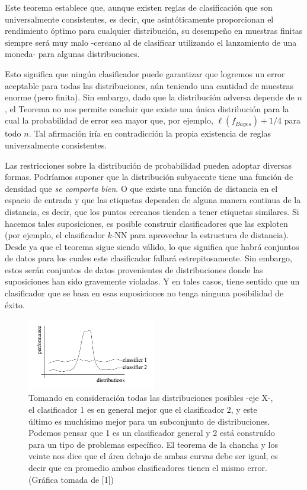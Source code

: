 \documentclass{report}
\begin{document}
Este teorema establece que, aunque existen reglas de clasificación que son universalmente 
consistentes, es decir, que asintóticamente proporcionan el rendimiento óptimo para cualquier 
distribución, su desempeño en muestras finitas siempre será muy malo -cercano al de clasificar utilizando el lanzamiento de una moneda- para algunas 
distribuciones. \newline

Esto significa que ningún clasificador puede garantizar que logremos un error aceptable 
para todas las distribuciones, aún teniendo una cantidad de muestras enorme (pero finita). 
Sin embargo, dado que la distribución adversa depende de \(n\), 
el Teorema no nos permite concluir que existe una única distribución para la cual la 
probabilidad de error sea mayor que, por ejemplo, \(\ell(f_{Bayes}) + 1/4\) para todo \(n\). Tal afirmación 
iría en contradicción la propia existencia de reglas universalmente consistentes. \newline


Las restricciones sobre la distribución de probabilidad pueden adoptar diversas formas. Podríamos suponer que la distribución 
subyacente tiene una función de densidad que \textit{se comporta bien}. O
que existe una función de distancia en el espacio de entrada y que las etiquetas dependen de alguna manera 
continua de la distancia, es decir, que los puntos cercanos tienden a tener etiquetas similares. Si 
hacemos tales suposiciones, es posible construir clasificadores que las exploten (por ejemplo, el clasificador 
\(k\)-NN para aprovechar la estructura de distancia). Desde ya que el teorema sigue siendo válido, lo que significa que habrá conjuntos de datos 
para los cuales este clasificador fallará estrepitosamente. Sin embargo, estos serán conjuntos de datos 
provenientes de distribuciones donde las suposiciones han sido gravemente violadas. Y en tales casos, tiene 
sentido que un clasificador que se basa en esas suposiciones no tenga ninguna posibilidad de éxito.

\begin{figure}[ht!]
    \centering
    \includegraphics[width=0.5\textwidth]{Images/7.png}
    \caption{Tomando en consideración todas las distribuciones posibles -eje X-, el clasificador 1
    es en general mejor que el clasificador 2, y este último es muchísimo mejor para un subconjunto
    de distribuciones. Podemos pensar que 1 es un clasificador general y 2 está construído para un tipo
    de problemas específico. El teorema de la chancha y los veinte nos dice que el área debajo de ambas
    curvas debe ser igual, es decir que en promedio ambos clasificadores tienen el mismo error. (Gráfica tomada de [1])}
    \label{fig:no_free_lunch_theorem}
\end{figure}
\end{document}

